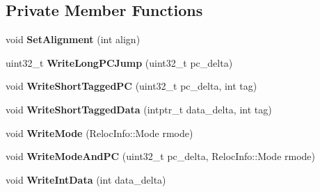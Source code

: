 \subsection*{Private Member Functions}
\begin{DoxyCompactItemize}
\item 
void {\bfseries Set\+Alignment} (int align)\hypertarget{classv8_1_1internal_1_1_b_a_s_e___e_m_b_e_d_d_e_d_ac434c50a731e3b9ccfb13d32e71cdb4b}{}\label{classv8_1_1internal_1_1_b_a_s_e___e_m_b_e_d_d_e_d_ac434c50a731e3b9ccfb13d32e71cdb4b}

\item 
uint32\+\_\+t {\bfseries Write\+Long\+P\+C\+Jump} (uint32\+\_\+t pc\+\_\+delta)\hypertarget{classv8_1_1internal_1_1_b_a_s_e___e_m_b_e_d_d_e_d_a692cc6d8e0800b63c7a5cdd3e2804239}{}\label{classv8_1_1internal_1_1_b_a_s_e___e_m_b_e_d_d_e_d_a692cc6d8e0800b63c7a5cdd3e2804239}

\item 
void {\bfseries Write\+Short\+Tagged\+PC} (uint32\+\_\+t pc\+\_\+delta, int tag)\hypertarget{classv8_1_1internal_1_1_b_a_s_e___e_m_b_e_d_d_e_d_af671695116d9a7f69220c8b56241639c}{}\label{classv8_1_1internal_1_1_b_a_s_e___e_m_b_e_d_d_e_d_af671695116d9a7f69220c8b56241639c}

\item 
void {\bfseries Write\+Short\+Tagged\+Data} (intptr\+\_\+t data\+\_\+delta, int tag)\hypertarget{classv8_1_1internal_1_1_b_a_s_e___e_m_b_e_d_d_e_d_a8cdef6411ce00812fe0d95a86e14adc4}{}\label{classv8_1_1internal_1_1_b_a_s_e___e_m_b_e_d_d_e_d_a8cdef6411ce00812fe0d95a86e14adc4}

\item 
void {\bfseries Write\+Mode} (Reloc\+Info\+::\+Mode rmode)\hypertarget{classv8_1_1internal_1_1_b_a_s_e___e_m_b_e_d_d_e_d_a01e75652b118a91c4eaa11e37c9407ef}{}\label{classv8_1_1internal_1_1_b_a_s_e___e_m_b_e_d_d_e_d_a01e75652b118a91c4eaa11e37c9407ef}

\item 
void {\bfseries Write\+Mode\+And\+PC} (uint32\+\_\+t pc\+\_\+delta, Reloc\+Info\+::\+Mode rmode)\hypertarget{classv8_1_1internal_1_1_b_a_s_e___e_m_b_e_d_d_e_d_a4585f6f416c1fc18063015794e02c9d2}{}\label{classv8_1_1internal_1_1_b_a_s_e___e_m_b_e_d_d_e_d_a4585f6f416c1fc18063015794e02c9d2}

\item 
void {\bfseries Write\+Int\+Data} (int data\+\_\+delta)\hypertarget{classv8_1_1internal_1_1_b_a_s_e___e_m_b_e_d_d_e_d_ae7958539fcc5bb3e203d3aae23a42555}{}\label{classv8_1_1internal_1_1_b_a_s_e___e_m_b_e_d_d_e_d_ae7958539fcc5bb3e203d3aae23a42555}


\end{DoxyCompactItemize}
